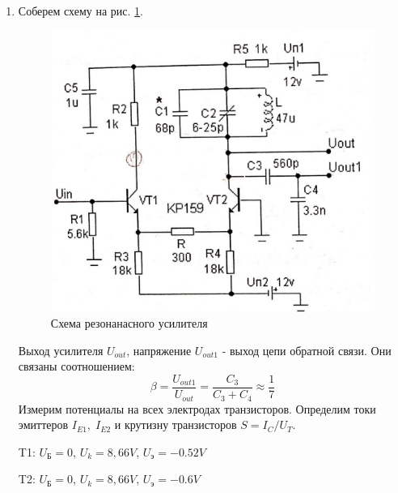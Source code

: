 \documentclass[a4paper]{article}
\begin{document}
\begin{enumerate}
    \item Соберем схему на рис. \ref{scheme_1}. \par

    \begin{figure}[H]
        \begin{center}
            \includegraphics[scale = 0.2]{scheme1.jpg}
            \caption{Схема резонанасного усилителя}
            \label{scheme_1}
        \end{center}
    \end{figure}

    Выход усилителя $U_{out}$, напряжение $U_{out1}$ - выход цепи обратной связи. Они связаны соотношением:
    $$\beta = \frac{U_{out1}}{U_{out}} = \frac{C_3}{C_3 + C_4} \approx \frac{1}{7}$$
    Измерим потенциалы на всех электродах транзисторов. Определим токи эмиттеров $I_{E1}, \; I_{E2}$ и крутизну транзисторов $S = I_C/U_T$.

    \begin{center}
        T1: $U_Б = 0$, $U_k = 8,66 V$, $U_э = -0.52 V$ \par 
        T2: $U_Б = 0$, $U_k = 8,66 V$, $U_э = -0.6 V$
    \end{center}

    \begin{center}
    \end{center}

    \begin{center}
    \end{center}




\end{enumerate}
\end{document}
